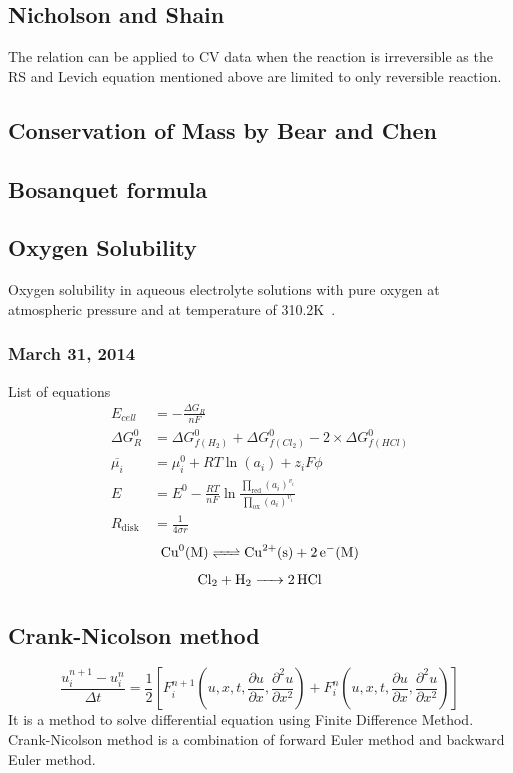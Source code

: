 \documentclass[12pt]{book}
\begin{document}
\subsection{Nicholson and Shain}
The relation can be applied to CV data when the reaction is irreversible as the RS and Levich equation mentioned above are limited to only reversible reaction.

\subsection{Conservation of Mass by Bear and Chen}
\subsection{Bosanquet formula}
\subsection{Oxygen Solubility}
Oxygen solubility in aqueous electrolyte solutions with pure oxygen at atmospheric pressure and at temperature of 310.2K~\cite{Lang1986}.
\subsubsection*{March 31, 2014}
List of equations
\begin{align}
E_{cell}&=-\frac{\Delta G_R}{nF}\\
\Delta G_R^0&=\Delta G_{f(H_2)}^0+\Delta G_{f(Cl_2)}^0-2\times\Delta G_{f(HCl)}^0\\
\overline{\mu_i}&={\mu_i^0}+RT\ln(a_i)+z_iF\phi\\
E&=E^0-\frac{RT}{nF}\ln\frac{\prod\limits_\textrm{red}(a_i)^{v_i}}{\prod\limits_\textrm{ox}(a_i)^{v_i}}\\
R_{\textrm{disk}}&=\frac{1}{4\sigma r}
\end{align}
\begin{equation}
\ce{Cu^0(M) <=> Cu^{2+}(s) + 2e^-(M)}
\end{equation}
\begin{equation}
\ce{Cl_2 + H_2 -> 2HCl}
\end{equation}

\subsection{Crank-Nicolson method}
\begin{equation}
\frac{u_i^{n+1} - u_i^n}{\Delta t} = \frac{1}{2}\left[F_i^{n+1}\left(u,x,t,\frac{\partial u}{\partial x},\frac{\partial^2 u}{\partial x^2}\right) + F_i^n\left(u,x,t,\frac{\partial u}{\partial x},\frac{\partial^2 u}{\partial x^2}\right)\right]
\end{equation}
It is a method to solve differential equation using Finite Difference Method. Crank-Nicolson method is a combination of forward Euler method and backward Euler method.
\end{document}
